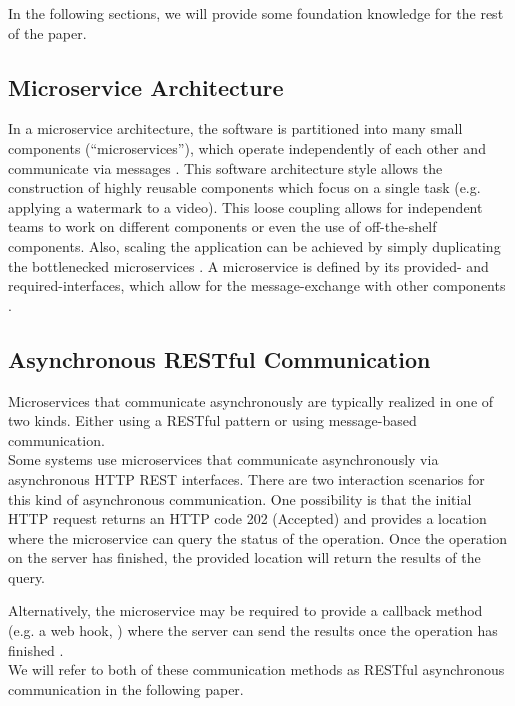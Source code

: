 In the following sections, we will provide some foundation knowledge for the rest of the paper.

\subsection{Microservice Architecture}
\label{sec:Foundation:MicroserviceArchitecture}
In a microservice architecture, the software is partitioned into many small components (``microservices''), which operate independently of each other and communicate via messages \cite{Dragoni2017}.
This software architecture style allows the construction of highly reusable components which focus on a single task (e.g. applying a watermark to a video).
This loose coupling allows for independent teams to work on different components or even the use of off-the-shelf components.
Also, scaling the application can be achieved by simply duplicating the bottlenecked microservices \cite{Dragoni2017}.
A microservice is defined by its provided- and required-interfaces, which allow for the message-exchange with other components \cite{Singh2021}.


\subsection{Asynchronous RESTful Communication}
\label{sec:Foundation:AsyncCommunication}
Microservices that communicate asynchronously are typically realized in one of two kinds.
Either using a RESTful pattern or using message-based communication. \\

Some systems use microservices that communicate asynchronously via asynchronous HTTP REST interfaces.
There are two interaction scenarios for this kind of asynchronous communication.
One possibility is that the initial HTTP request returns an HTTP code 202 (Accepted) and provides a location where the microservice can query the status of the operation.
Once the operation on the server has finished, the provided location will return the results of the query. \cite{Mayer2018}

Alternatively, the microservice may be required to provide a callback method (e.g. a web hook, \cite{Webhooks}) where the server can send the results once the operation has finished \cite{Mayer2018}. \\

We will refer to both of these communication methods as RESTful asynchronous communication in the following paper.


